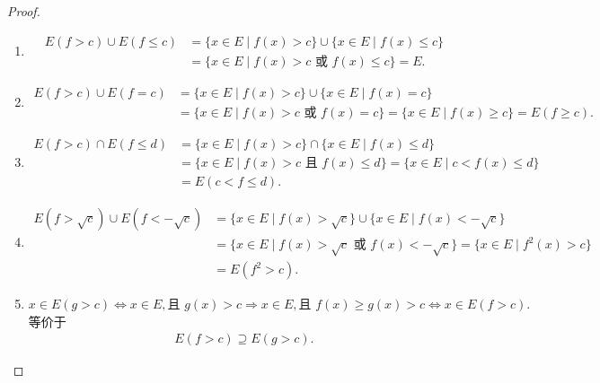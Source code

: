 \documentclass[../../main.tex]{subfiles}%
\begin{document}
\begin{proof}
\begin{enumerate}[(1)]
\item 
\begin{align*}
E(f > c) \cup E(f \leqslant c) &= \{x \in E \mid f(x) > c\} \cup \{x \in E \mid f(x) \leqslant c\} \\
&= \{x \in E \mid f(x) > c \text{ 或 } f(x) \leqslant c\} = E.
\end{align*}

\item 
\begin{align*}
E(f > c) \cup E(f = c) &= \{x \in E \mid f(x) > c\} \cup \{x \in E \mid f(x) = c\} \\
&= \{x \in E \mid f(x) > c \text{ 或 } f(x) = c\} = \{x \in E \mid f(x) \geqslant c\} = E(f \geqslant c).
\end{align*}

\item 
\begin{align*}
E(f > c) \cap E(f \leqslant d) &= \{x \in E \mid f(x) > c\} \cap \{x \in E \mid f(x) \leqslant d\} \\
&= \{x \in E \mid f(x) > c \text{ 且 } f(x) \leqslant d\} = \{x \in E \mid c < f(x) \leqslant d\} \\
&= E(c < f \leqslant d).
\end{align*}

\item 
\begin{align*}
E(f > \sqrt{c}) \cup E(f < -\sqrt{c}) &= \{x \in E \mid f(x) > \sqrt{c}\} \cup \{x \in E \mid f(x) < -\sqrt{c}\} \\
&= \{x \in E \mid f(x) > \sqrt{c} \text{ 或 } f(x) < -\sqrt{c}\} = \{x \in E \mid f^2(x) > c\} \\
&= E(f^2 > c).
\end{align*}

\item 
$x \in E(g > c) \Leftrightarrow x \in E, \text{且 } g(x) > c \Rightarrow x \in E, \text{且 } f(x) \geqslant g(x) > c \Leftrightarrow x \in E(f > c).$
等价于
\begin{align*}
E(f > c) \supseteq E(g > c).
\end{align*}


\end{enumerate}
\end{proof}
\end{document}
